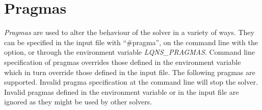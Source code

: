 \section{Pragmas}
\label{sec:lqns-pragmas}
\emph{Pragmas} are used to alter the behaviour of the solver in a
variety of ways.  They can be specified in the input file with
``\#pragma'', on the command line with the  option, or through
the environment variable \emph{LQNS\_PRAGMAS}.  Command line
specification of pragmas overrides those defined in the environment
variable which in turn override those defined in the input file.  The
following pragmas are supported.  Invalid pragma specification at the
command line will stop the solver.  Invalid pragmas defined in the
environment variable or in the input file are ignored as they might be
used by other solvers.
